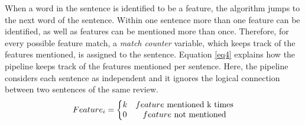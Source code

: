 When a word in the sentence is identified to be a feature, the algorithm jumps to the next word of the sentence. Within one sentence more than one feature can be identified, as well as features can be mentioned more than once. Therefore, for every possible feature match, a\textit{ match counter } variable, which keeps track of the features mentioned, is assigned to the sentence. Equation \ref{eq4} explains how the pipeline keeps track of the features mentioned per sentence. Here, the pipeline considers each sentence as independent and it ignores the logical connection between two sentences of the same review.
\begin{equation}
  Feature_i=\left\{
    \begin{array}{@{} l c @{}}
      k & \text{$feature$ mentioned k times} \\
      0 & \text{$feature$ not mentioned}
    \end{array}\right.
  \label{eq4}
\end{equation}


